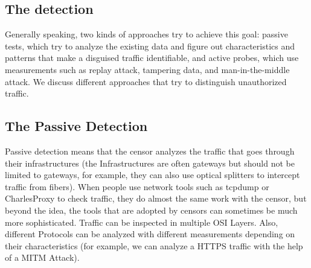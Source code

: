 \documentclass[conference]{IEEEtran}
\begin{document}
\subsection{The detection}\label{sec:detection}
Generally speaking, two kinds of approaches try to achieve this goal: passive tests, which try to analyze the existing data and figure out characteristics and patterns that make a disguised traffic identifiable, and active probes, which use measurements such as replay attack, tampering data, and man-in-the-middle attack. We discuss different approaches that try to distinguish unauthorized traffic.

\subsection{The Passive Detection}
Passive detection means that the censor analyzes the traffic that goes through their infrastructures (the Infrastructures are often gateways but should not be limited to gateways, for example, they can also use optical splitters to intercept traffic from fibers). When people use network tools such as tcpdump or CharlesProxy\texttrademark{} to check traffic, they do almost the same work with the censor, but beyond the idea, the tools that are adopted by censors can sometimes be much more sophisticated. Traffic can be inspected in multiple OSI Layers. Also, different Protocols can be analyzed with different measurements depending on their characteristics (for example, we can analyze a HTTPS traffic with the help of a MITM Attack).
\end{document}
